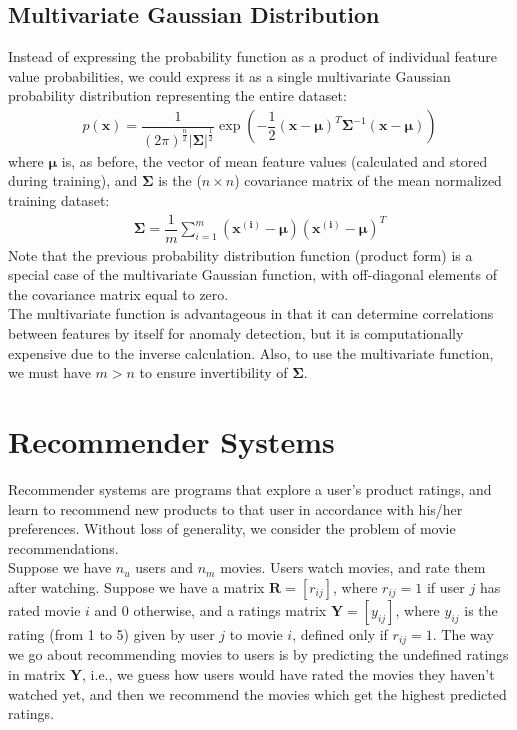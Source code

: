 \documentclass[a4paper, 12pt]{article}
\begin{document}
\subsection{Multivariate Gaussian Distribution}
Instead of expressing the probability function as a product of individual feature value probabilities, we could express it as a single multivariate Gaussian probability distribution representing the entire dataset:
\begin{align*}
p\left(\bm{x}\right) = \dfrac{1}{\left(2\pi\right)^{\frac{n}{2}}|\bm{\Sigma}|^{\frac{1}{2}}}\exp\left(-\dfrac{1}{2}\left(\bm{x}-\bm{\mu}\right)^T\bm{\Sigma}^{-1}\left(\bm{x}-\bm{\mu}\right)\right)
\end{align*}
where $\bm{\mu}$ is, as before, the vector of mean feature values (calculated and stored during training), and $\bm{\Sigma}$ is the ($n \times n$) covariance matrix of the mean normalized training dataset:
\begin{align*}
\bm{\Sigma} = \dfrac{1}{m}\sum_{i=1}^{m}\left(\bm{x^{\left(i\right)}} - \bm{\mu}\right)\left(\bm{x^{\left(i\right)}} - \bm{\mu}\right)^T
\end{align*}
Note that the previous probability distribution function (product form) is a special case of the multivariate Gaussian function, with off-diagonal elements of the covariance matrix equal to zero. \\
\break
The multivariate function is advantageous in that it can determine correlations between features by itself for anomaly detection, but it is computationally expensive due to the inverse calculation. Also, to use the multivariate function, we must have $m > n$ to ensure invertibility of $\bm{\Sigma}$.


\section{Recommender Systems}
Recommender systems are programs that explore a user's product ratings, and learn to recommend new products to that user in accordance with his/her preferences. Without loss of generality, we consider the problem of movie recommendations.\\
\break
Suppose we have $n_u$ users and $n_m$ movies. Users watch movies, and rate them after watching. Suppose we have a matrix $\bm{R} = \left[r_{ij}\right]$, where $r_{ij} = 1$ if user $j$ has rated movie $i$ and $0$ otherwise, and a ratings matrix $\bm{Y} = \left[y_{ij}\right]$, where $y_{ij}$ is the rating (from 1 to 5) given by user $j$ to movie $i$, defined only if $r_{ij} = 1$. The way we go about recommending movies to users is by predicting the undefined ratings in matrix $\bm{Y}$, i.e., we guess how users would have rated the movies they haven't watched yet, and then we recommend the movies which get the highest predicted ratings.
\end{document}
